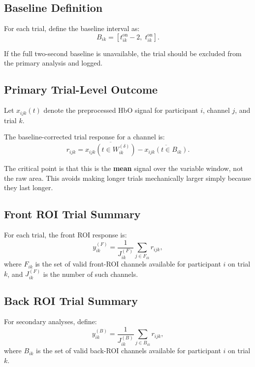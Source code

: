 \subsection{Baseline Definition}
For each trial, define the baseline interval as:
\begin{equation}
B_{ik} = [t^{\mathrm{on}}_{ik} - 2,\; t^{\mathrm{on}}_{ik}].
\end{equation}

If the full two-second baseline is unavailable, the trial should be excluded from the primary analysis
and logged.

\subsection{Primary Trial-Level Outcome}
Let \(x_{ijk}(t)\) denote the preprocessed HbO signal for participant \(i\), channel \(j\), and trial \(k\).

The baseline-corrected trial response for a channel is:
\begin{equation}
r_{ijk}
=
\overline{x_{ijk}(t \in W^{(\delta)}_{ik})}
-
\overline{x_{ijk}(t \in B_{ik})}.
\end{equation}

The critical point is that this is the \textbf{mean} signal over the variable window, not the raw area.
This avoids making longer trials mechanically larger simply because they last longer.

\subsection{Front ROI Trial Summary}
For each trial, the front ROI response is:
\begin{equation}
y^{(F)}_{ik}
=
\frac{1}{J^{(F)}_{ik}}
\sum_{j \in F_{ik}} r_{ijk},
\end{equation}
where \(F_{ik}\) is the set of valid front-ROI channels available for participant \(i\) on trial \(k\),
and \(J^{(F)}_{ik}\) is the number of such channels.

\subsection{Back ROI Trial Summary}
For secondary analyses, define:
\begin{equation}
y^{(B)}_{ik}
=
\frac{1}{J^{(B)}_{ik}}
\sum_{j \in B_{ik}} r_{ijk},
\end{equation}
where \(B_{ik}\) is the set of valid back-ROI channels available for participant \(i\) on trial \(k\).

